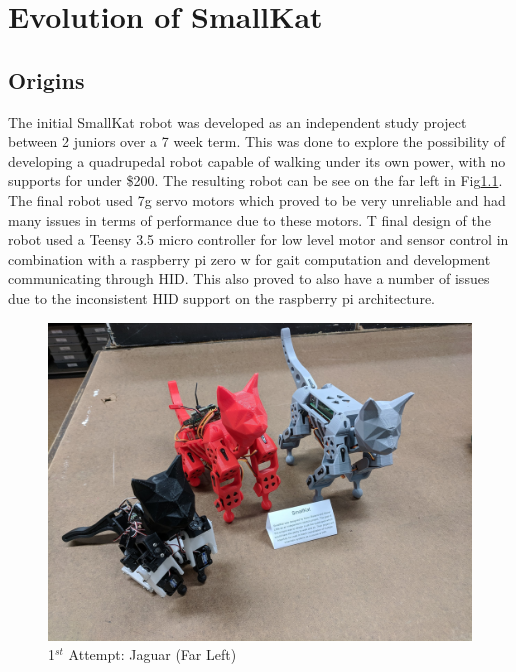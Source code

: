 \documentclass[12pt]{report}
\begin{document}

\chapter{Evolution of SmallKat}

\section{Origins}
The initial SmallKat robot was developed as an independent study project between 2 juniors over a 7 week term. This was done to explore the possibility of developing a quadrupedal robot capable of walking under its own power, with no supports for under \$200. The resulting robot can be see on the far left in Fig\ref{fig:Jaguar}. The final robot used 7g servo motors which proved to be very unreliable and had many issues in terms of performance due to these motors. T final design of the robot used a Teensy 3.5 micro controller for low level motor and sensor control in combination with a raspberry pi zero w for gait computation and development communicating through HID. This also proved to also have a number of issues due to the inconsistent HID support on the raspberry pi architecture. 
\begin{figure}[H]
    \centering
    \includegraphics[width=0.5\textheight]{Images/V1andV2.jpg}
    \caption{1$^{st}$ Attempt: Jaguar (Far Left)}
    \label{fig:Jaguar}
\end{figure}
\end{document}
